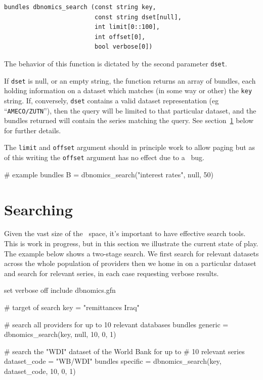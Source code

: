 \documentclass{article}
\begin{document}
\begin{funcdoc}
\begin{verbatim}
bundles dbnomics_search (const string key,
                         const string dset[null],
                         int limit[0::100],
                         int offset[0],
                         bool verbose[0])
\end{verbatim}
  The behavior of this function is dictated by the second parameter
  \texttt{dset}.

  If \texttt{dset} is null, or an empty string, the function
  returns an array of bundles, each holding information on a dataset
  which matches (in some way or other) the \texttt{key} string. If,
  conversely, \texttt{dset} contains a valid dataset representation
  (eg ``\texttt{AMECO/ZUTN}''), then the query will be limited to that
  particular dataset, and the bundles returned will contain the series
  matching the query. See section~\ref{sec:search} below for further
  details.

  The \texttt{limit} and \texttt{offset} argument should in principle
  work to allow paging but as of this writing the \texttt{offset}
  argument has no effect due to a \DB\ bug.
\begin{code}
# example
bundles B = dbnomics_search("interest rates", null, 50)
\end{code}
\end{funcdoc}

\section{Searching \DB}
\label{sec:search}

Given the vast size of the \DB\ space, it's important to
have effective search tools. This is work in progress, but in this
section we illustrate the current state of play. The example below
shows a two-stage search. We first search for relevant datasets across
the whole population of providers then we home in on a particular
dataset and search for relevant series, in each case requesting
verbose results.

\begin{code}
set verbose off
include dbnomics.gfn

# target of search
key = "remittances Iraq"

# search all providers for up to 10 relevant databases
bundles generic = dbnomics_search(key, null, 10, 0, 1)

# search the "WDI" dataset of the World Bank for up to
# 10 relevant series
dataset_code = "WB/WDI"
bundles specific = dbnomics_search(key, dataset_code, 10, 0, 1)
\end{code}
\end{document}
